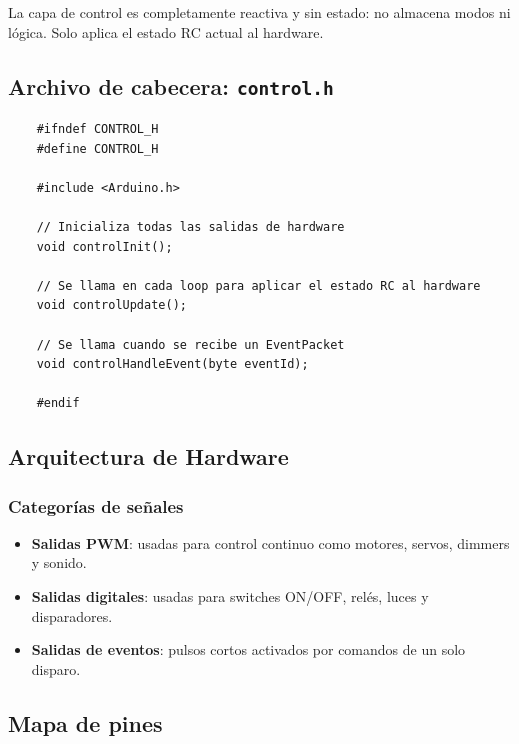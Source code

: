\documentclass[12pt,a4paper]{article}
\newcommand{\ardfnDG}[1]{\texttt{\textcolor{arduinoTeal}{#1}}}
\begin{document}
La capa de control es completamente reactiva y sin estado: no almacena
modos ni lógica. Solo aplica el estado RC actual al hardware.

\subsection{Archivo de cabecera: \ardfnDG{control.h}}

\begin{lstlisting}
	#ifndef CONTROL_H
	#define CONTROL_H
	
	#include <Arduino.h>
	
	// Inicializa todas las salidas de hardware
	void controlInit();
	
	// Se llama en cada loop para aplicar el estado RC al hardware
	void controlUpdate();
	
	// Se llama cuando se recibe un EventPacket
	void controlHandleEvent(byte eventId);
	
	#endif
\end{lstlisting}

\subsection{Arquitectura de Hardware}

\subsubsection{Categorías de señales}

\begin{itemize}
	\item \textbf{Salidas PWM}:
	usadas para control continuo como motores, servos, dimmers y sonido.
	\item \textbf{Salidas digitales}:
	usadas para switches ON/OFF, relés, luces y disparadores.
	\item \textbf{Salidas de eventos}:
	pulsos cortos activados por comandos de un solo disparo.
\end{itemize}

\subsection{Mapa de pines}
\end{document}
